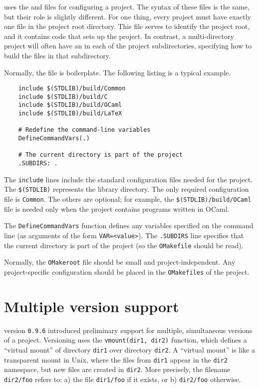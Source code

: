 \Prog{\OMake} uses the  and  files for configuring a project.  The
syntax of these files is the same, but their role is slightly different.  For one thing, every
project must have exactly one  file in the project root directory.  This file serves
to identify the project root, and it contains code that sets up the project.  In contrast, a
multi-directory project will often have an  in each of the project subdirectories,
specifying how to build the files in that subdirectory.

Normally, the  file is boilerplate.  The following listing is a typical example.

\begin{verbatim}
    include $(STDLIB)/build/Common
    include $(STDLIB)/build/C
    include $(STDLIB)/build/OCaml
    include $(STDLIB)/build/LaTeX

    # Redefine the command-line variables
    DefineCommandVars(.)

    # The current directory is part of the project
    .SUBDIRS: .
\end{verbatim}

The \verb+include+ lines include the standard configuration files needed for the project.  The
\verb+$(STDLIB)+ represents the  library directory.  The only required configuration
file is \verb+Common+.  The others are optional; for example, the \verb+$(STDLIB)/build/OCaml+ file
is needed only when the project contains programs written in OCaml.

The \verb+DefineCommandVars+ function defines any variables specified on the command line (as
arguments of the form \verb+VAR=<value>+).  The \verb+.SUBDIRS+ line specifies that the current
directory is part of the project (so the \verb+OMakefile+ should be read).

Normally, the \verb+OMakeroot+ file should be small and project-independent.  Any project-specific
configuration should be placed in the \verb+OMakefiles+ of the project.

\section{Multiple version support}

\OMake{} version \verb+0.9.6+ introduced preliminary support for multiple, simultaneous versions of a
project.  Versioning uses the \verb+vmount(dir1, dir2)+ function, which defines a ``virtual mount''
of directory \verb+dir1+ over directory \verb+dir2+.  A ``virtual mount'' is like a transparent
mount in Unix, where the files from \verb+dir1+ appear in the \verb+dir2+ namespace, but new files
are created in \verb+dir2+.  More precisely, the filename \verb+dir2/foo+ refers to: a) the file
\verb+dir1/foo+ if it exists, or b) \verb+dir2/foo+ otherwise.


